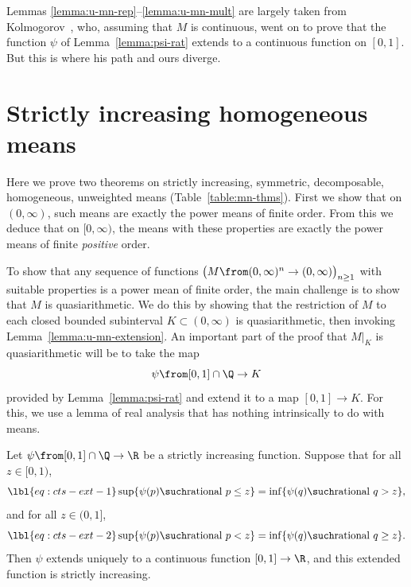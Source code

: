 Lemmas \ref{lemma:u-mn-rep}--\ref{lemma:u-mn-mult} are
largely taken from Kolmogorov~\cite{KolmSNM,KolmONM},%
%
% 
who, assuming that $M$ is continuous, went on to prove that the function
$\psi$ of Lemma~\ref{lemma:psi-rat} extends to a continuous function on
$[0, 1]$.  But this is where his path and ours diverge.


\section{Strictly increasing homogeneous means}


Here we prove two theorems on strictly increasing, symmetric, decomposable,
homogeneous, unweighted means (Table~\ref{table:mn-thms}).  First we show
that on $(0, \infty)$, such means are exactly the power means of finite
order.  From this we deduce that on $[0, \infty)$, the means with these
properties are exactly the power means of finite \emph{positive} order.

To show that any sequence of functions $\bigl( M \from (0, \infty)^n \to
(0, \infty) \bigr)_{n \geq 1}$ with suitable properties is a power mean of
finite order, the main challenge is to show that $M$ is quasiarithmetic.
We do this by showing that the restriction of $M$ to each closed bounded
subinterval $K \subset (0, \infty)$ is quasiarithmetic, then invoking
Lemma~\ref{lemma:u-mn-extension}.
% 
An important part of the proof that $M|_K$ is quasiarithmetic will be to
take the map
\[
\psi \from [0, 1] \cap \Q \to K
\]
provided by Lemma~\ref{lemma:psi-rat} and extend it to a map $[0, 1] \to
K$.  For this, we use a lemma of real analysis that has nothing
intrinsically to do with means.

\begin{lemma}
Let $\psi \from [0, 1] \cap \Q \to \R$ be a strictly increasing function.
Suppose that for all $z \in [0, 1)$,
% 
\begin{equation}
\lbl{eq:cts-ext-1}
\sup \{ \psi(p) \such \text{rational } p \leq z \}
=
\inf \{ \psi(q) \such \text{rational } q > z\},
\end{equation}
% 
and for all $z \in (0, 1]$, 
% 
\begin{equation}
\lbl{eq:cts-ext-2}
\sup \{ \psi(p) \such \text{rational } p < z\}
=
\inf \{ \psi(q) \such \text{rational } q \geq z\}.
\end{equation}
% 
Then $\psi$ extends uniquely to a continuous function $[0, 1] \to \R$, and
this extended function is strictly increasing.
\end{lemma}

